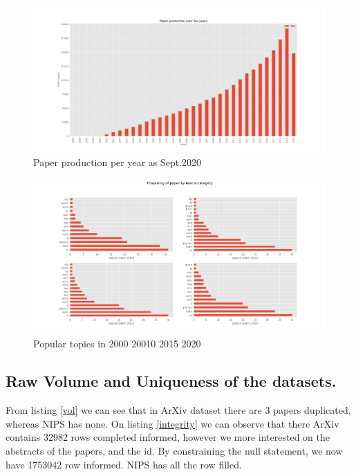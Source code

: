 \begin{figure}
\centering
\includegraphics[width=1\linewidth]{images/paper_prod}
\caption{Paper production per year as Sept.2020}
\label{fig:paper_prod}
\end{figure}


\begin{figure}
\centering
\includegraphics[width=1\linewidth]{images/paper_topics}
\caption{Popular topics in 2000 20010 2015 2020}
\label{fig:paper_topics}
\end{figure}

\subsection{Raw Volume and Uniqueness of the datasets.}

From listing \ref{vol} we can see that in ArXiv dataset there are 3 papers duplicated, whereas NIPS has none. On listing \ref{integrity}
we can observe that there ArXiv contains 32982 rows completed informed, however we more interested on the abstracts of the papers, and the id. 
By constraining the null statement, we now have 1753042 row informed. NIPS has all the row filled. 

